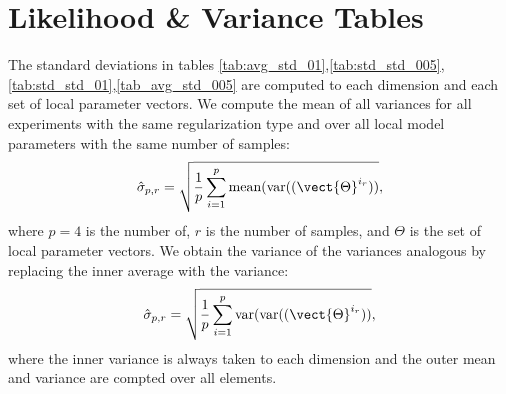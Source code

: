 \section{Likelihood \& Variance Tables}
The standard deviations in tables \ref{tab:avg_std_01},\ref{tab:std_std_005},\ref{tab:std_std_01},\ref{tab_avg_std_005} are computed \wrt to each dimension and each set of local parameter vectors.
We compute the mean of all variances for all experiments with the same regularization type and over all local model parameters with the same number of samples:
\begin{equation}
    \label{eq:meanvar}
    \hat{\sigma}_{p,r} = \sqrt{\frac{1}{p} \sum_{i=1}^p \text{mean}(\text{var}((\vect{\Theta}^{i_r}))},
\end{equation}
where $p=4$ is the number of, $r$ is the number of samples, and $\Theta$ is the set of local parameter vectors.
We obtain the variance of the variances analogous by replacing the inner average with the variance:
\begin{equation}
    \label{eq:varvar}
    \hat{\sigma}_{p,r} = \sqrt{\frac{1}{p} \sum_{i=1}^p \text{var}(\text{var}((\vect{\Theta}^{i_r}))},
\end{equation}
where the inner variance is always taken \wrt to each dimension and the outer mean and variance are compted over all elements.

